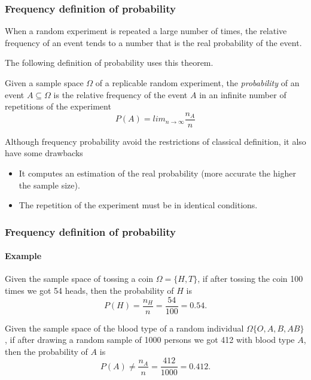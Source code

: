 \begin{frame}
\frametitle{Frequency definition of probability}
\begin{theorem}
When a random experiment is repeated a large number of times, the relative frequency of an event tends to a number that
is the real probability of the event.
\end{theorem}

The following definition of probability uses this theorem.
\begin{definition}
Given a sample space $\Omega$ of a replicable random experiment, the \emph{probability} of an event $A\subseteq \Omega$
is the relative frequency of the event $A$ in an infinite number of repetitions of the experiment 
\[
P(A) = lim_{n\rightarrow \infty}\frac{n_{A}}{n}
\]
\end{definition}

Although frequency probability avoid the restrictions of classical definition, it also have some drawbacks
\begin{itemize}
\item It computes an estimation of the real probability (more accurate the higher the sample size).
\item The repetition of the experiment must be in identical conditions.
\end{itemize}
\end{frame}


\begin{frame}
\frametitle{Frequency definition of probability}
\framesubtitle{Example}
Given the sample space of tossing a coin $\Omega=\{H,T\}$, if after tossing the coin 100 times we got 54 heads, then the
probability of $H$ is
\[
P(H) = \frac{n_H}{n} = \frac{54}{100} = 0.54.
\]

Given the sample space of the blood type of a random individual $\Omega\{O,A,B,AB\}$, if after drawing a random sample
of 1000 persons we got 412 with blood type $A$, then the probability of $A$ is 
\[
P(A) \neq \frac{n_A}{n} = \frac{412}{1000} = 0.412.
\]
\end{frame}



